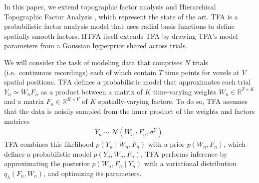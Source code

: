 \documentclass[twoside]{article}
\begin{document}
In this paper, we extend topographic factor analysis \citep{manning2014topographic} and Hierarchical Topographic Factor Analysis \citep{manning2014hierarchical,manning2018probabilistic}, which represent the state of the art. TFA is a probabilistic factor analysis model that uses radial basis functions to define spatially smooth factors. HTFA itself extends TFA by drawing TFA's model parameters from a Gaussian hyperprior shared across trials. 

We will consider the task of modeling data that comprises $N$ trials (i.e.~continuous recordings) each of which contain $T$ time points for voxels at $V$ spatial positions. TFA defines a probabilistic model that approximates each trial $Y_{n} \simeq W_{n} F_{n}$ as a product between a matrix of $K$ time-varying weights $W_n \in \mathbb{R}^{T \times K}$ and a matrix $F_n \in \mathbb{R}^{K \times V}$ of $K$ spatially-varying factors. To do so, TFA assumes that the data is noisily sampled from the inner product of the weights and factors matrices
\begin{align}
    Y_{n} \sim \mathcal{N}\left(W_{n} \cdot F_{n},\sigma^Y\right).
\end{align}
TFA combines this likelihood $p(Y_n \mid W_n, F_n)$ with a prior $p(W_n, F_n)$, which defines a probabilistic model $p(Y_n, W_n, F_n)$. TFA performs inference by approximating the posterior $p(W_n,F_n \mid Y_n)$ with a variational distribution $q_{\lambda}(F_n, W_n)$, and optimizing its parameters.
\end{document}
